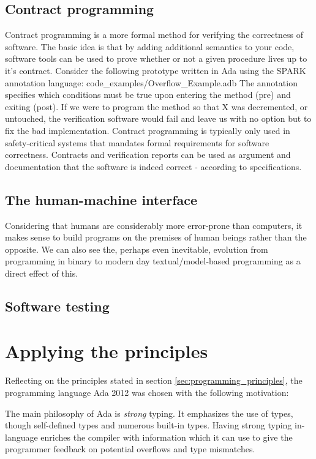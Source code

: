 \documentclass[10pt,a4paper]{article}
\begin{document}
\subsection{Contract programming}
Contract programming is a more formal method for verifying the correctness of software.
The basic idea is that by adding additional semantics to your code, software tools can be used to prove whether or not a given procedure lives up to it's contract.
Consider the following prototype written in Ada using the SPARK annotation language:
 {code_examples/Overflow_Example.adb}
The annotation specifies which conditions must be true upon entering the method (pre) and exiting (post). If we were to program the method so that X was decremented, or untouched, the verification software would fail and leave us with no option but to fix the bad implementation.
Contract programming is typically only used in safety-critical systems that mandates formal requirements for software correctness. Contracts and verification reports can be used as argument and documentation that the software is indeed correct - according to specifications.

\subsection{The human-machine interface}
Considering that humans are considerably more error-prone than computers, it makes sense to build programs on the premises of human beings rather than the opposite. We can also see the, perhaps even inevitable, evolution from programming in binary to modern day textual/model-based programming as a direct effect of this.

\subsection{Software testing}

\section{Applying the principles}
Reflecting on the principles stated in section \ref{sec:programming_principles}, the programming language Ada 2012 was chosen with the following motivation:

The main philosophy of Ada is \emph{strong} typing. It emphasizes the use of types, though self-defined types and numerous built-in types. Having strong typing in-language enriches the compiler with information which it can use to give the programmer feedback on potential overflows and type mismatches.
\end{document}
